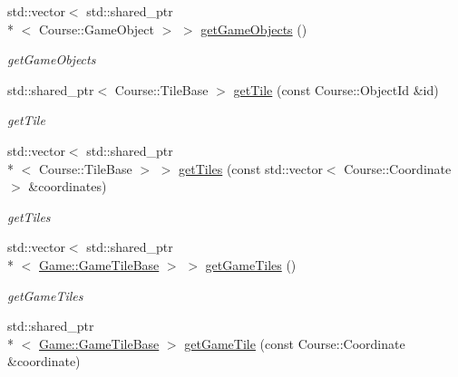 \begin{DoxyCompactItemize}
\item 
std\-::vector$<$ std\-::shared\-\_\-ptr\\*
$<$ Course\-::\-Game\-Object $>$ $>$ \hyperlink{class_game_1_1_game_object_manager_a770203790e7e11185bf53ef1f066cd6c}{get\-Game\-Objects} ()
\begin{DoxyCompactList}\small\item\em get\-Game\-Objects \end{DoxyCompactList}\item 
std\-::shared\-\_\-ptr$<$ Course\-::\-Tile\-Base $>$ \hyperlink{class_game_1_1_game_object_manager_acfcc8a567591bf1bcb3d7a040534383b}{get\-Tile} (const Course\-::\-Object\-Id \&id)
\begin{DoxyCompactList}\small\item\em get\-Tile \end{DoxyCompactList}\item 
std\-::vector$<$ std\-::shared\-\_\-ptr\\*
$<$ Course\-::\-Tile\-Base $>$ $>$ \hyperlink{class_game_1_1_game_object_manager_a2db95d0caf64f0745bfb78d38ab5eb9f}{get\-Tiles} (const std\-::vector$<$ Course\-::\-Coordinate $>$ \&coordinates)
\begin{DoxyCompactList}\small\item\em get\-Tiles \end{DoxyCompactList}\item 
std\-::vector$<$ std\-::shared\-\_\-ptr\\*
$<$ \hyperlink{class_game_1_1_game_tile_base}{Game\-::\-Game\-Tile\-Base} $>$ $>$ \hyperlink{class_game_1_1_game_object_manager_ac600164bb9c69c764aeb0c110a772305}{get\-Game\-Tiles} ()
\begin{DoxyCompactList}\small\item\em get\-Game\-Tiles \end{DoxyCompactList}\item 
\hypertarget{class_game_1_1_game_object_manager_a1b7ed09f5aa0db4be872b580040d2614}{std\-::shared\-\_\-ptr\\*
$<$ \hyperlink{class_game_1_1_game_tile_base}{Game\-::\-Game\-Tile\-Base} $>$ \hyperlink{class_game_1_1_game_object_manager_a1b7ed09f5aa0db4be872b580040d2614}{get\-Game\-Tile} (const Course\-::\-Coordinate \&coordinate)}\label{class_game_1_1_game_object_manager_a1b7ed09f5aa0db4be872b580040d2614}


\end{DoxyCompactItemize}
